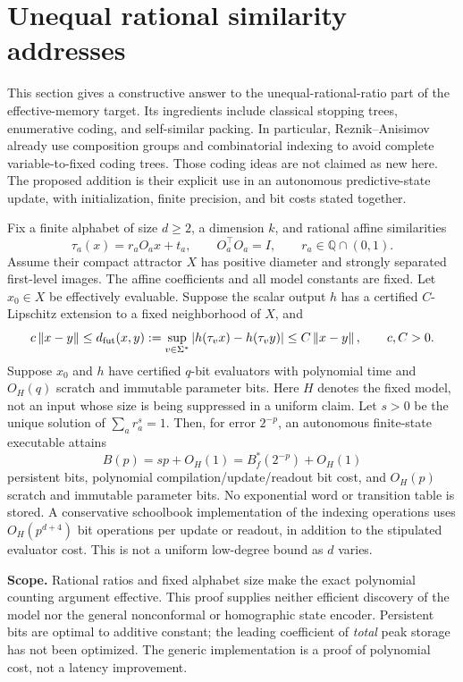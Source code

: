 \section{Unequal rational similarity addresses}\label{III:M:audit:sec:addresses}
This section gives a constructive answer to the
unequal-rational-ratio part of the effective-memory target. Its ingredients
include classical stopping trees, enumerative coding, and self-similar packing.
In particular, Reznik--Anisimov~\cite{reznik} already use composition groups and
combinatorial indexing to avoid complete variable-to-fixed coding trees.
Those coding ideas are not claimed as new here. The proposed addition is their
explicit use in an autonomous predictive-state update, with initialization,
finite precision, and bit costs stated together.

\begin{theorem}
\label{III:M:audit:thm:addresses}
Fix a finite alphabet of size $d\ge2$, a dimension $k$, and rational affine
similarities
\[
 \tau_a(x)=r_aO_ax+t_a,\qquad O_a^\top O_a=I,\qquad
 r_a\in\mathbb Q\cap(0,1).
\]
Assume their compact attractor $X$ has positive diameter and strongly separated
first-level images. The affine coefficients and all model constants are fixed.
Let $x_0\in X$ be effectively evaluable. Suppose the scalar output $h$ has a
certified $C$-Lipschitz extension to a fixed neighborhood of $X$, and
\[
 c\left\lVert x-y\right\rVert\le d_{\mathrm{fut}}(x,y)
 :=\sup_{v\in\Sigma^*}|h(\tau_vx)-h(\tau_vy)|
 \le C\left\lVert x-y\right\rVert,\qquad c,C>0.
\]
Suppose $x_0$ and $h$ have certified $q$-bit evaluators with polynomial time
and $O_H(q)$ scratch and immutable parameter bits. Here $H$ denotes the fixed
model, not an input whose size is being suppressed in a uniform claim.
Let $s>0$ be the unique solution of $\sum_a r_a^s=1$.
Then, for error $2^{-p}$, an autonomous finite-state executable attains
\[
 B(p)=sp+O_H(1)=B_f^*(2^{-p})+O_H(1)
\]
persistent bits, polynomial compilation/update/readout bit cost, and $O_H(p)$
scratch and immutable parameter bits. No exponential word or transition table
is stored. A conservative schoolbook implementation of the indexing operations
uses $O_H(p^{d+4})$ bit operations per update or readout, in addition to the
stipulated evaluator cost. This is not a uniform low-degree bound as $d$ varies.
\end{theorem}



\textbf{Scope.} Rational ratios and fixed alphabet size make the exact
polynomial counting argument effective. This proof supplies neither efficient
discovery of the model nor the general nonconformal or homographic state encoder.
Persistent bits are optimal to additive constant; the leading coefficient of
\emph{total} peak storage has not been optimized. The generic implementation
is a proof of polynomial cost, not a latency improvement.

